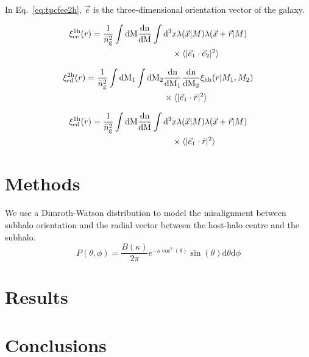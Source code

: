\documentclass[fleqn,usenatbib]{mnras}
\newcommand{\tpcf}[1]{\xi_{\rm #1}}
\newcommand{\tpcftwo}[2]{\xi_{\rm #1}^{\rm #2}}
\newcommand{\dd}{\rm d}
\newcommand{\mean}[1]{\langle #1 \rangle}
\begin{document}
In Eq.~\ref{eq:tpcfee2h}, $\vec{e}$ is the three-dimensional orientation vector of the galaxy. 

\begin{align}
\begin{split}
\tpcftwo{ee}{1h}(r) =  \frac{1}{\bar{n}_{\rm g}^{2}} \int\dd M \frac{\rm dn}{\dd M} \int\dd^{3}& x\lambda(\vec{x}\vert M)\lambda(\vec{x}+\vec{r}\vert M)\\ & \times  \mean{\vert\vec{e}_{1}\cdot\vec{e}_{2}\vert^{2}}
\end{split}
\end{align}

\begin{align}
\begin{split}
\tpcftwo{ed}{2h}(r) =   \frac{1}{\bar{n}_{\rm g}^{2}}\int\dd M_1 \int\dd M_2 & \frac{\rm dn}{\dd M_1}\frac{\rm dn}{\dd M_2} \tpcf{hh}(r\vert M_1, M_2) \\& \times  \mean{\vert\vec{e}_{1}\cdot\hat{r}\vert^{2}}
\end{split}
\end{align}

\begin{align}
\begin{split}
\tpcftwo{ed}{1h}(r) =  \frac{1}{\bar{n}_{\rm g}^{2}} \int\dd M \frac{\rm dn}{\dd M} \int\dd^{3}& x\lambda(\vec{x}\vert M)\lambda(\vec{x}+\vec{r}\vert M)\\ & \times  \mean{\vert\vec{e}_{1}\cdot\hat{r}\vert^{2}}
\end{split}
\end{align}

\section{Methods}

We use a Dimroth-Watson distribution to model the misalignment between subhalo orientation and the radial vector between the host-halo centre and the subhalo.   
\begin{equation}
P(\theta,\phi) = \frac{B(\kappa)}{2\pi}e^{-\kappa\cos^2(\theta)}\sin(\theta)\mathrm{d}\theta\mathrm{d}\phi
\label{eq:watson}
\end{equation}

\section{Results}

\section{Conclusions}
\end{document}
